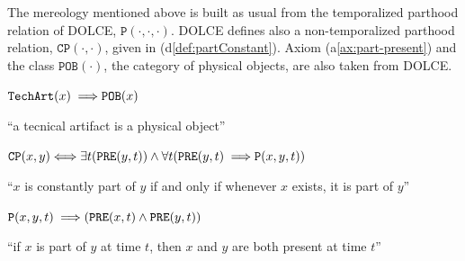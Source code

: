 \documentclass[sw]{iosart2x}
\newcommand{\bflist}{\begin{list}{}{\setlength{\topsep}{2mm}\setlength{\partopsep}{0mm}\setlength{\parsep}{0mm}\setlength{\leftmargin}{9mm}\setlength{\labelwidth}{8mm}}}
\newcommand{\eflist}{\end{list}}
\newcommand{\AxLabel}{\textrm{a}}
\newcommand{\DefLabel}{\textrm{d}}
\newcounter{cntax}
\newcommand{\myax}[1]{\refstepcounter{cntax}\begin{small}{\bf \AxLabel\thecntax\label{ax:#1}}\end{small}}
\newcounter{cntdef}
\newcommand{\mydf}[1]{\refstepcounter{cntdef}\begin{small}{\bf \DefLabel\thecntdef\label{def:#1}}\end{small}}
\newcommand{\mytext}[1]{``#1''}
\newcommand{\refax}[1]{({\AxLabel}\ref{#1})}
\newcommand{\refdf}[1]{({\DefLabel}\ref{#1})}
\newcommand{\generalStyle}[1]{\texttt{#1}}
\newcommand{\biRel}[3]{\generalStyle{#1}(#2,#3)}
\newcommand{\uniRel}[2]{\generalStyle{#1}(#2)}
\newcommand{\triRel}[4]{\generalStyle{#1}(#2,#3,#4)}
\newcommand{\myiff}{\Longleftrightarrow}
\newcommand{\myfi}{\hspace{0.9mm} \Longrightarrow}
\newcommand{\DOLCE}{\textsc{DOLCE}\xspace} %
\newcommand{\DOLCEPhysObj}[1]{\uniRel{{POB}}{#1}}
\newcommand{\DOLCEPartBin}[2]{\biRel{{CP}}{#1}{#2}}
\newcommand{\DOLCEPart}[3]{\triRel{{P}}{#1}{#2}{#3}}
\newcommand{\DOLCEPRE}[2]{\biRel{PRE}{#1}{#2}}
\newcommand{\TechArt}[1]{\uniRel{TechArt}{#1}}
\begin{document}

The mereology mentioned above is built as usual from the temporalized parthood relation of \DOLCE,  $\DOLCEPart{\cdot}{\cdot}{\cdot}$. \DOLCE defines also a non-temporalized parthood relation, $\DOLCEPartBin{\cdot}{\cdot}$, given in \refdf{def:partConstant}. Axiom \refax{ax:part-present} and the class $\DOLCEPhysObj{\cdot}$, the category of physical objects, are also taken from \DOLCE.
\bflist
\item[\myax{subsumptionTArt}] $ \TechArt{x} \myfi \DOLCEPhysObj{x}$
\item \mytext{a tecnical artifact is a physical object}
\item[\mydf{partConstant}] $ \DOLCEPartBin{x}{y}  \myiff \exists t (\DOLCEPRE{y}{t}) \land \forall t (\DOLCEPRE{y}{t} \myfi \DOLCEPart{x}{y}{t})$
\item \mytext{$x$ is constantly part of $y$ if and only if whenever $x$ exists, it is part of $y$}
\item[\myax{part-present}] $ \DOLCEPart{x}{y}{t} \myfi (\DOLCEPRE{x}{t} \land \DOLCEPRE{y}{t})$
\item \mytext{if $x$ is part of $y$ at time $t$, then $x$ and $y$ are both present at time $t$}
\eflist
\end{document}
